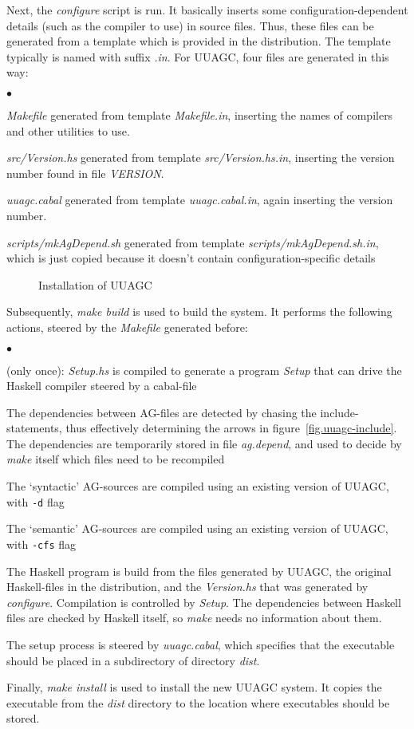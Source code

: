 \documentclass[twoside]{article}
\newenvironment{itize}{\begin{list}{$\bullet$}{\parsep=0pt\parskip=0pt\topsep=0pt\itemsep=0pt}}{\end{list}}
\newcommand{\simplepicture}[2]{\centerline{\mbox{\texttt{[image: figs/\#2]}}}}
\begin{document}
Next, the {\em configure} script is run.
It basically inserts some configuration-dependent details
(such as the compiler to use) in source files.
Thus, these files can be generated from a template which is provided in the distribution.
The template typically is named with suffix {\em .in}.
For UUAGC, four files are generated in this way:
\begin{itize}
\item {\em Makefile} generated from template {\em Makefile.in}, 
      inserting the names of compilers and other utilities to use.
\item {\em src/Version.hs} generated from template {\em src/Version.hs.in},
      inserting the version number found in file {\em VERSION}.
\item {\em uuagc.cabal} generated from template {\em uuagc.cabal.in},
      again inserting the version number.
\item {\em scripts/mkAgDepend.sh} generated from template {\em scripts/mkAgDepend.sh.in},
      which is just copied because it doesn't contain configuration-specific details
\end{itize}
\begin{figure}[htbp]
\raisebox{0mm}{\simplepicture{0.7}{uuagc-install}}
\caption{Installation of UUAGC}
\label{fig.uuagc-install}
\end{figure}

Subsequently, {\em make build} is used to build the system. 
It performs the following actions, steered by the {\em Makefile} generated before:
\begin{itize}
\item (only once):
      {\em Setup.hs} is compiled to generate a program {\em Setup} that can drive the Haskell compiler
      steered by a cabal-file
\item The dependencies between AG-files are detected by chasing the include-statements,
      thus effectively determining the arrows in figure~\ref{fig.uuagc-include}. 
      The dependencies are temporarily stored in file {\em ag.depend},
      and used to decide by {\em make} itself which files need to be recompiled
\item The `syntactic' AG-sources are compiled using an existing version of UUAGC, with \verb"-d" flag
\item The `semantic' AG-sources are compiled using an existing version of UUAGC, with \verb"-cfs" flag
\item The Haskell program is build from the files generated by UUAGC, the original Haskell-files
      in the distribution, and the {\em Version.hs} that was generated by {\em configure}.
      Compilation is controlled by {\em Setup}.
      The dependencies between Haskell files are checked by Haskell itself, so {\em make}
      needs no information about them.
\end{itize}
The setup process is steered by {\em uuagc.cabal}, which specifies that the executable
should be placed in a subdirectory of directory {\em dist}.

Finally, {\em make install} is used to install the new UUAGC system.
It copies the executable from the {\em dist} directory to the location where
executables should be stored.
\end{document}
